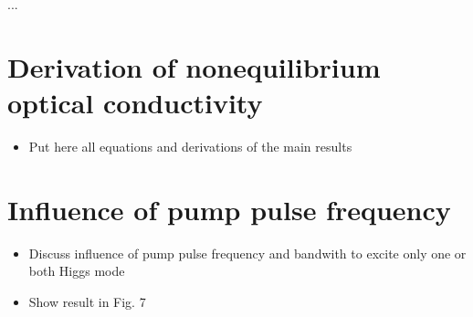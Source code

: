 \documentclass[aps,prb,reprint,noeprint,superscriptaddress]{revtex4-1}
\begin{document}
\begin{acknowledgments}
...
\end{acknowledgments}











\appendix


\section{Derivation of nonequilibrium optical conductivity}
\label{sec:derivation_noneq_cond}


\begin{itemize}
	\item Put here all equations and derivations of the main results
\end{itemize}






\section{Influence of pump pulse frequency}
\label{sec:influence_pump_pulse_freq}

\begin{itemize}
	\item Discuss influence of pump pulse frequency and bandwith to excite only one or both Higgs mode
	\item Show result in Fig. 7
\end{itemize}
\end{document}
